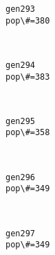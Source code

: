 \documentclass[11pt]{article}
\begin{document}
    \begin{Verbatim}[commandchars=\\\{\}]
gen293
pop\#=380

    \end{Verbatim}

    \begin{center}
    \end{center}
    { \hspace*{\fill} \\}
    
    \begin{Verbatim}[commandchars=\\\{\}]
gen294
pop\#=383

    \end{Verbatim}

    \begin{center}
    \end{center}
    { \hspace*{\fill} \\}
    
    \begin{Verbatim}[commandchars=\\\{\}]
gen295
pop\#=358

    \end{Verbatim}

    \begin{center}
    \end{center}
    { \hspace*{\fill} \\}
    
    \begin{Verbatim}[commandchars=\\\{\}]
gen296
pop\#=349

    \end{Verbatim}

    \begin{center}
    \end{center}
    { \hspace*{\fill} \\}
    
    \begin{Verbatim}[commandchars=\\\{\}]
gen297
pop\#=349

    \end{Verbatim}
\end{document}
